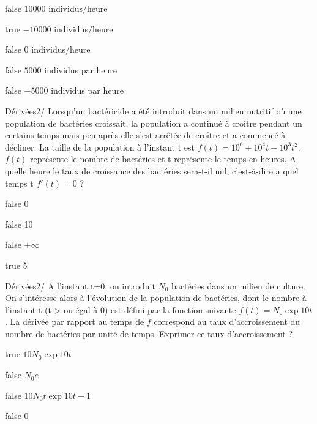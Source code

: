             \begin{reponses}
            	\item[false] $10000$ individus/heure
            	\item[true]  $-10000$ individus/heure
                \item[false]   $0$ individus/heure
                \item[false] $5000$ individus par heure
                \item[false] $-5000$ individus par heure
            \end{reponses}
			\begin{question}{22}{Dérivées}{2}{/}
			  Lorsqu'un bactéricide a été introduit dans un milieu nutritif où une population de bactéries croissait, la population a continué à croître pendant un certains temps mais peu après elle s'est arrêtée de croître et a commencé à décliner. La taille de la population à l'instant t est $f(t) = 10^6 + 10^4 t - 10^3 t^2$. $f(t)$ représente le nombre de bactéries et t représente le temps en heures. A quelle heure le taux de croissance des bactéries sera-t-il nul, c'est-à-dire a quel temps t $f'(t)=0$ ?
            \end{question}
            \begin{reponses}
            	\item[false] 0
            	\item[false] 10
                \item[false]  $+\infty$ 
                \item[true]  5
            \end{reponses}
			\begin{question}{22}{Dérivées}{2}{/}
			 A l'instant t=0, on introduit $N_0$ bactéries dans un milieu de culture. On s'intéresse alors à l'évolution de la population de bactéries, dont le nombre à l'instant t (t > ou égal à 0) est défini par la fonction suivante $f(t) = N_0 \exp{10t}$. La dérivée par rapport au temps de $f$ correspond au taux d'accroissement du nombre de bactéries par unité de temps. Exprimer ce taux d'accroissement ?
            \end{question}
            \begin{reponses}
            	\item[true]   $10 N_0 \exp{10t} $
            	\item[false]  $N_0 e $
                \item[false]  $10 N_0 t \exp{10t-1} $
                \item[false]  $0 $
            \end{reponses}
